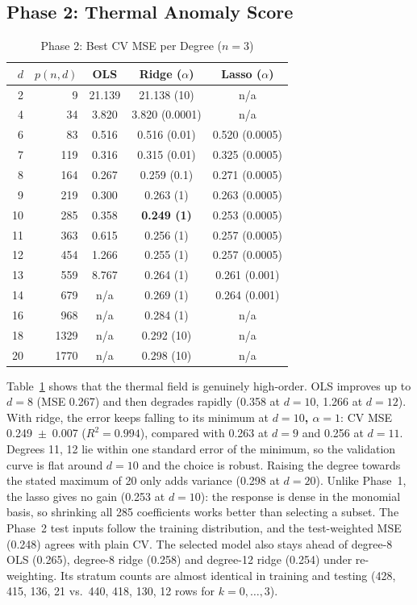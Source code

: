 \documentclass[conference]{IEEEtran}
\begin{document}
\subsection{Phase 2: Thermal Anomaly Score}
\begin{table}[!t]
\renewcommand{\arraystretch}{1.12}
\caption{Phase 2: Best CV MSE per Degree ($n=3$)}
\label{tab:deg2}
\centering\footnotesize
\setlength{\tabcolsep}{4pt}
\begin{tabular}{@{}rrccc@{}}
\toprule
$d$ & $p(n,d)$ & OLS & Ridge ($\alpha$) & Lasso ($\alpha$) \\
\midrule
2 & 9 & 21.139 & 21.138 (10) & n/a \\
4 & 34 & 3.820 & 3.820 (0.0001) & n/a \\
6 & 83 & 0.516 & 0.516 (0.01) & 0.520 (0.0005) \\
7 & 119 & 0.316 & 0.315 (0.01) & 0.325 (0.0005) \\
8 & 164 & 0.267 & 0.259 (0.1) & 0.271 (0.0005) \\
9 & 219 & 0.300 & 0.263 (1) & 0.263 (0.0005) \\
10 & 285 & 0.358 & \textbf{0.249 (1)} & 0.253 (0.0005) \\
11 & 363 & 0.615 & 0.256 (1) & 0.257 (0.0005) \\
12 & 454 & 1.266 & 0.255 (1) & 0.257 (0.0005) \\
13 & 559 & 8.767 & 0.264 (1) & 0.261 (0.001) \\
14 & 679 & n/a & 0.269 (1) & 0.264 (0.001) \\
16 & 968 & n/a & 0.284 (1) & n/a \\
18 & 1329 & n/a & 0.292 (10) & n/a \\
20 & 1770 & n/a & 0.298 (10) & n/a \\
\bottomrule
\end{tabular}
\end{table}

Table~\ref{tab:deg2} shows that the thermal field is genuinely high-order. OLS improves up to $d=8$ (MSE 0.267) and then degrades rapidly (0.358 at $d=10$, 1.266 at $d=12$). With ridge, the error keeps falling to its minimum at \textbf{$d=10$, $\alpha=1$}: CV MSE 0.249~$\pm$~0.007 ($R^2=0.994$), compared with 0.263 at $d=9$ and 0.256 at $d=11$. Degrees 11, 12 lie within one standard error of the minimum, so the validation curve is flat around $d=10$ and the choice is robust. Raising the degree towards the stated maximum of 20 only adds variance (0.298 at $d=20$). Unlike Phase~1, the lasso gives no gain (0.253 at $d=10$): the response is dense in the monomial basis, so shrinking all 285 coefficients works better than selecting a subset. The Phase~2 test inputs follow the training distribution, and the test-weighted MSE (0.248) agrees with plain CV. The selected model also stays ahead of degree-8 OLS (0.265), degree-8 ridge (0.258) and degree-12 ridge (0.254) under re-weighting. Its stratum counts are almost identical in training and testing (428, 415, 136, 21 vs.\ 440, 418, 130, 12 rows for $k=0,\dots,3$).
\end{document}
